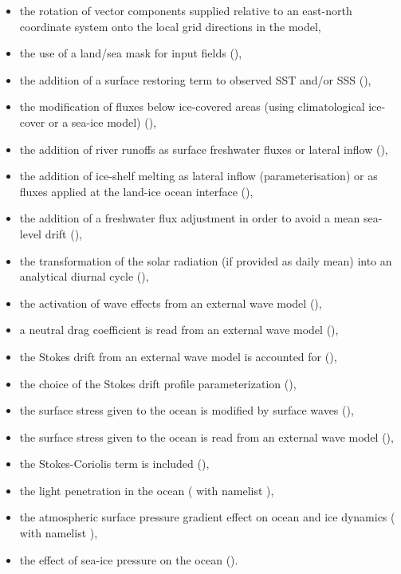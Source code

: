 \documentclass[../main/NEMO_manual]{subfiles}
\begin{document}
\begin{itemize}
\item the rotation of vector components supplied relative to an east-north coordinate system onto
  the local grid directions in the model,
\item the use of a land/sea mask for input fields (),
\item the addition of a surface restoring term to observed SST and/or SSS (),
\item the modification of fluxes below ice-covered areas (using climatological ice-cover or a sea-ice model)
  (),
\item the addition of river runoffs as surface freshwater fluxes or lateral inflow (),
\item the addition of ice-shelf melting as lateral inflow (parameterisation) or
  as fluxes applied at the land-ice ocean interface (),
\item the addition of a freshwater flux adjustment in order to avoid a mean sea-level drift
  (),
\item the transformation of the solar radiation (if provided as daily mean) into an analytical diurnal cycle
  (),
\item the activation of wave effects from an external wave model  (),
\item a neutral drag coefficient is read from an external wave model (),
\item the Stokes drift from an external wave model is accounted for (),
\item the choice of the Stokes drift profile parameterization (),
\item the surface stress given to the ocean is modified by surface waves (),
\item the surface stress given to the ocean is read from an external wave model (),
\item the Stokes-Coriolis term is included (),
\item the light penetration in the ocean ( with namelist ),
\item the atmospheric surface pressure gradient effect on ocean and ice dynamics ( with namelist ),
\item the effect of sea-ice pressure on the ocean ().
\end{itemize}
\end{document}
